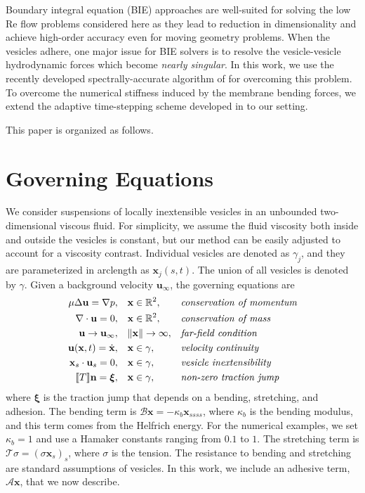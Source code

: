 \documentclass[aps,prl,twocolumn,showpacs,amsmath,amssymb]{revtex4-1}
\renewcommand{\AA}{\mathcal{A}}
\newcommand{\BB}{\mathcal{B}}
\newcommand{\nn}{\mathbf{n}}
\newcommand{\RR}{\mathbb{R}}
\newcommand{\TT}{\mathcal{T}}
\newcommand{\uu}{\mathbf{u}}
\newcommand{\xx}{\mathbf{x}}
\newcommand{\xxi}{\boldsymbol{\xi}}
\begin{document}
Boundary integral equation (BIE) approaches are well-suited for solving the low Re flow problems considered here as they lead to reduction in dimensionality and 
achieve high-order accuracy even for moving geometry problems. When the vesicles adhere, one major issue for BIE solvers is to resolve the vesicle-vesicle hydrodynamic forces which become 
{\em nearly singular}. In this work, we use the recently developed spectrally-accurate algorithm of \cite{barnett2015spectrally} for overcoming this problem. To overcome the numerical stiffness induced by the membrane bending forces, 
we extend the adaptive time-stepping scheme developed in \cite{quaife2016adaptive} to our setting. 

This paper is organized as follows.




\section{Governing Equations}
We consider suspensions of locally inextensible vesicles in an unbounded
two-dimensional viscous fluid.  For simplicity, we assume the fluid
viscosity both inside and outside the vesicles is constant, but our
method can be easily adjusted to account for a viscosity contrast.
Individual vesicles are denoted as $\gamma_j$, and they are
parameterized in arclength as $\xx_j(s,t)$.  The union of all vesicles
is denoted by $\gamma$.  Given a background velocity $\uu_\infty$, the
governing equations are
\begin{equation*}
\begin{aligned}
  \mu \Delta \uu = \nabla p, \quad &\xx \in \RR^2,
    &&\mbox{\em conservation of momentum} \\
  \nabla \cdot \uu = 0, \quad &\xx \in \RR^2, 
    &&\mbox{\em conservation of mass} \\
  \uu \rightarrow \uu_\infty, \quad &\|\xx\| \rightarrow \infty,
    &&\mbox{\em far-field condition} \\
  \uu(\xx,t) = \dot{\xx}, \quad &\xx \in \gamma,
    &&\mbox{\em velocity continuity} \\
  \xx_s \cdot \uu_s =0, \quad &\xx \in \gamma,
    &&\mbox{\em vesicle inextensibility} \\
  \llbracket T \rrbracket \nn = \xxi, \quad &\xx \in \gamma,
    &&\mbox{\em non-zero traction jump}
\end{aligned}
\end{equation*}
where $\xxi$ is the traction jump that depends on a bending, stretching,
and adhesion.  The bending term is $\BB \xx = -\kappa_b \xx_{ssss}$,
where $\kappa_b$ is the bending modulus, and this term comes from the
Helfrich energy.  For the numerical examples, we set $\kappa_b = 1$ and
use a Hamaker constants ranging from $0.1$ to $1$.  The stretching term
is $\TT \sigma  = (\sigma \xx_s)_s$, where $\sigma$ is the tension.  The
resistance to bending and stretching are standard assumptions of
vesicles.  In this work, we include an adhesive term, $\AA \xx$, that we
now describe.
\end{document}
